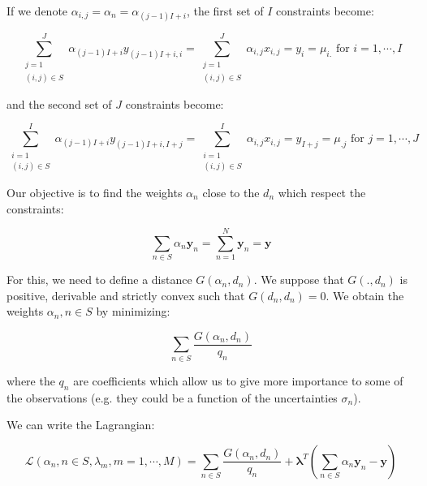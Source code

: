\documentclass{tex/note}
\begin{document}
If we denote $\alpha_{i,j} = \alpha_n = \alpha_{\left(j-1\right) I + i}$, the first set of $I$ constraints become:

\begin{equation*}
\sum_{\substack{j = 1 \\ \left(i,j\right) \in S}}^J \alpha_{\left(j-1\right) I + i} y_{\left(j-1\right) I + i,i} = \sum_{\substack{j = 1 \\ \left(i,j\right) \in S}}^J \alpha_{i,j} x_{i,j} = y_i = \mu_{i.} \text{ for } i = 1 , \cdots , I
\end{equation*}

and the second set of $J$ constraints become:

\begin{equation*}
\sum_{\substack{i = 1 \\ \left(i,j\right) \in S}}^I \alpha_{\left(j-1\right) I + i} y_{\left(j-1\right) I + i,I + j} = \sum_{\substack{i = 1 \\ \left(i,j\right) \in S}}^I \alpha_{i,j} x_{i,j} = y_{I + j} = \mu_{.j} \text{ for } j = 1 , \cdots , J
\end{equation*}

Our objective is to find the weights $\alpha_n$ close to the $d_n$ which respect the constraints:

\begin{equation*}
\sum_{n \in S} \alpha_n \bm{y}_n = \sum_{n = 1}^N \bm{y}_n = \bm{y}
\end{equation*}

For this, we need to define a distance $G \left( \alpha_n , d_n \right)$. We suppose that $G \left( . , d_n \right)$ is positive, derivable and strictly convex such that $G \left( d_n , d_n \right) = 0$. We obtain the weights $\alpha_n, n \in S$ by minimizing:

\begin{equation*}
\sum_{n \in S} \frac{G \left( \alpha_n , d_n \right)}{q_n}
\end{equation*}

where the $q_n$ are coefficients which allow us to give more importance to some of the observations (e.g. they could be a function of the uncertainties $\sigma_n$).

\vspace{1em}

We can write the Lagrangian:

\begin{equation*}
\mathcal{L} \left( \alpha_n , n \in S , \lambda_m , m = 1 , \cdots , M \right) = \sum_{n \in S} \frac{G \left( \alpha_n , d_n \right)}{q_n} + \bm{\lambda}^T \left( \sum_{n \in S} \alpha_n \bm{y}_n - \bm{y} \right)
\end{equation*}
\end{document}
